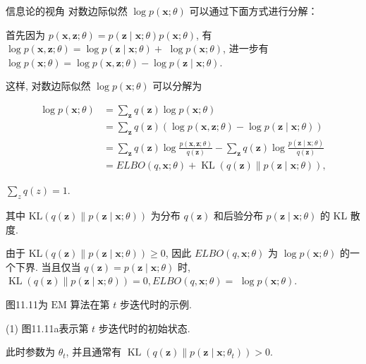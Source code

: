 \documentclass[10pt]{article}
\begin{document}
信息论的视角 对数边际似然 $\log p(\boldsymbol{x} ; \theta)$ 可以通过下面方式进行分解：

首先因为 $p(\boldsymbol{x}, \boldsymbol{z} ; \theta)=p(\boldsymbol{z} \mid \boldsymbol{x} ; \theta) p(\boldsymbol{x} ; \theta)$, 有 $\log p(\boldsymbol{x}, \boldsymbol{z} ; \theta)=\log p(\boldsymbol{z} \mid \boldsymbol{x} ; \theta)+$ $\log p(\boldsymbol{x} ; \theta)$, 进一步有 $\log p(\boldsymbol{x} ; \theta)=\log p(\boldsymbol{x}, \boldsymbol{z} ; \theta)-\log p(\boldsymbol{z} \mid \boldsymbol{x} ; \theta)$.

这样, 对数边际似然 $\log p(\boldsymbol{x} ; \theta)$ 可以分解为


\begin{align*}
\log p(\boldsymbol{x} ; \theta) & =\sum_{\boldsymbol{z}} q(\boldsymbol{z}) \log p(\boldsymbol{x} ; \theta)  \tag{11.46}\\
& =\sum_{\boldsymbol{z}} q(\boldsymbol{z})(\log p(\boldsymbol{x}, \boldsymbol{z} ; \theta)-\log p(\boldsymbol{z} \mid \boldsymbol{x} ; \theta))  \tag{11.47}\\
& =\sum_{\boldsymbol{z}} q(\boldsymbol{z}) \log \frac{p(\boldsymbol{x}, \boldsymbol{z} ; \theta)}{q(\boldsymbol{z})}-\sum_{\boldsymbol{z}} q(\boldsymbol{z}) \log \frac{p(\boldsymbol{z} \mid \boldsymbol{x} ; \theta)}{q(\boldsymbol{z})}  \tag{11.48}\\
& =E L B O(q, \boldsymbol{x} ; \theta)+\operatorname{KL}(q(\boldsymbol{z}) \| p(\boldsymbol{z} \mid \boldsymbol{x} ; \theta)), \tag{11.49}
\end{align*}


$\sum_{z} q(z)=1$.

其中 $\mathrm{KL}(q(\boldsymbol{z}) \| p(\boldsymbol{z} \mid \boldsymbol{x} ; \theta))$ 为分布 $q(\boldsymbol{z})$ 和后验分布 $p(\boldsymbol{z} \mid \boldsymbol{x} ; \theta)$ 的 KL 散度.

由于 $\mathrm{KL}(q(\boldsymbol{z}) \| p(\boldsymbol{z} \mid \boldsymbol{x} ; \theta)) \geq 0$, 因此 $E L B O(q, \boldsymbol{x} ; \theta)$ 为 $\log p(\boldsymbol{x} ; \theta)$ 的一个下界. 当且仅当 $q(\boldsymbol{z})=p(\boldsymbol{z} \mid \boldsymbol{x} ; \theta)$ 时, $\operatorname{KL}(q(\boldsymbol{z}) \| p(\boldsymbol{z} \mid \boldsymbol{x} ; \theta))=0, E L B O(q, \boldsymbol{x} ; \theta)=$ $\log p(\boldsymbol{x} ; \theta)$.

图11.11为 $\mathrm{EM}$ 算法在第 $t$ 步迭代时的示例.

(1) 图11.11a表示第 $t$ 步迭代时的初始状态.

此时参数为 $\theta_{t}$, 并且通常有 $\operatorname{KL}\left(q(\boldsymbol{z}) \| p\left(\boldsymbol{z} \mid \boldsymbol{x} ; \theta_{t}\right)\right)>0$.
\end{document}
